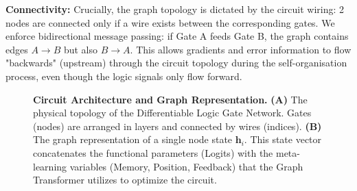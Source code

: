\textbf{Connectivity:}
Crucially, the graph topology is dictated by the circuit wiring: 2 nodes are connected only if a wire exists between the corresponding gates. We enforce bidirectional message passing: if Gate A feeds Gate B, the graph contains edges $A \rightarrow B$ but also $B \rightarrow A$.
This allows gradients and error information to flow "backwards" (upstream) through the circuit topology during the self-organisation process, even though the logic signals only flow forward.


\begin{figure}[ht]
    \centering
    \resizebox{\linewidth}{!}{%
        
    }
    \caption[Circuit Architecture and Graph Representation]{\textbf{Circuit Architecture and Graph Representation.} \textbf{(A)} The physical topology of the Differentiable Logic Gate Network. Gates (nodes) are arranged in layers and connected by wires (indices). \textbf{(B)} The graph representation of a single node state $\mathbf{h}_i$. This state vector concatenates the functional parameters (Logits) with the meta-learning variables (Memory, Position, Feedback) that the Graph Transformer utilizes to optimize the circuit.}
    \label{ch5:fig:circuit_schematic}
\end{figure}


